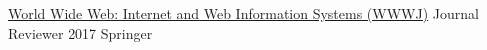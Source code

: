 
\begin{cventries}
  \cventryc
    {\href{https://link.springer.com/journal/11280}{World Wide Web: Internet and Web Information Systems (WWWJ)}}
    {Journal Reviewer}
    {2017}
    {Springer}
  
\end{cventries}
